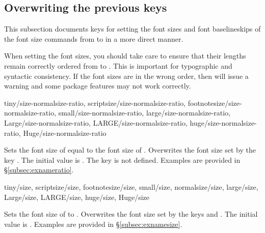 \documentclass{beerydoc}
\begin{document}
\subsection{Overwriting the previous keys}
\label{subsec:overwriting}

This subsection documents keys for setting the font sizes and font
baselineskips of the font size commands from  to  in a more
direct manner.

When setting the font sizes, you should take care to ensure that their lengths
remain correctly ordered from  to .
This is important for typographic and syntactic consistency.
If the font sizes are in the wrong order, then  will issue a
warning and some package features may not work correctly.

\begin{codedoc}
  {
    tiny/size-normalsize-ratio,
    scriptsize/size-normalsize-ratio,
    footnotesize/size-normalsize-ratio,
    small/size-normalsize-ratio,
    large/size-normalsize-ratio,
    Large/size-normalsize-ratio,
    LARGE/size-normalsize-ratio,
    huge/size-normalsize-ratio,
    Huge/size-normalsize-ratio
  }
  \begin{syntax}
  \end{syntax}
  Sets the font size of  equal to the font size of
   \texttimes{} .
  Overwrites the font size set by the key .
  The initial value is .
  The key  is not defined.
  Examples are provided in \S\ref{subsec:exnameratio}.
\end{codedoc}

\begin{codedoc}
  {
    tiny/size,
    scriptsize/size,
    footnotesize/size,
    small/size,
    normalsize/size,
    large/size,
    Large/size,
    LARGE/size,
    huge/size,
    Huge/size
  }
  \begin{syntax}
  \end{syntax}
  Sets the font size of  to .
  Overwrites the font size set by the keys  and
  .
  The initial value is .
  Examples are provided in \S\ref{subsec:exnamesize}.
\end{codedoc}
\end{document}
